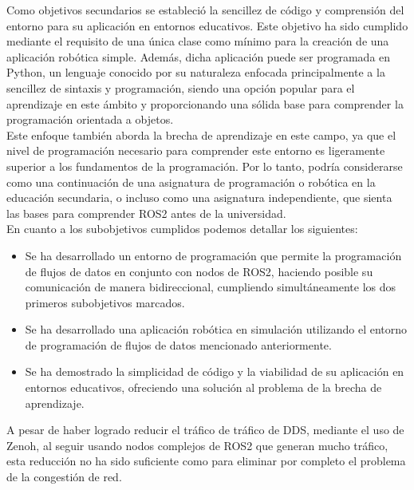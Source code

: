 Como objetivos secundarios se estableció la sencillez de código y comprensión
del entorno para su aplicación en entornos educativos.
Este objetivo ha sido cumplido mediante el requisito de una única clase como
mínimo para la creación de una aplicación robótica simple.
Además, dicha aplicación puede ser programada en Python, un lenguaje conocido
por su naturaleza enfocada principalmente a la sencillez de sintaxis y
programación, siendo una opción popular para el aprendizaje en este ámbito y
proporcionando una sólida base para comprender la programación orientada a
objetos.
\\

Este enfoque también aborda la brecha de aprendizaje en este campo, ya que el
nivel de programación necesario para comprender este entorno es ligeramente
superior a los fundamentos de la programación.
Por lo tanto, podría considerarse como una continuación de una asignatura de
programación o robótica en la educación secundaria, o incluso como una
asignatura independiente, que sienta las bases para comprender ROS2 antes de la
universidad.
\\

En cuanto a los subobjetivos cumplidos podemos detallar los siguientes:

\begin{itemize}
    \item{Se ha desarrollado un entorno de programación que permite la
        programación de flujos de datos en conjunto con nodos de ROS2, haciendo
        posible su comunicación de manera bidireccional, cumpliendo
        simultáneamente los dos primeros subobjetivos marcados.}
    \item{Se ha desarrollado una aplicación robótica en simulación utilizando el
        entorno de programación de flujos de datos mencionado anteriormente.}
    \item{Se ha demostrado la simplicidad de código y la viabilidad de su
        aplicación en entornos educativos, ofreciendo una solución al problema
        de la brecha de aprendizaje.}
\end{itemize}

A pesar de haber logrado reducir el tráfico de tráfico de DDS, mediante el uso
de Zenoh, al seguir usando nodos complejos de ROS2 que generan mucho tráfico,
esta reducción no ha sido suficiente como para eliminar por completo el problema
de la congestión de red.
\\

